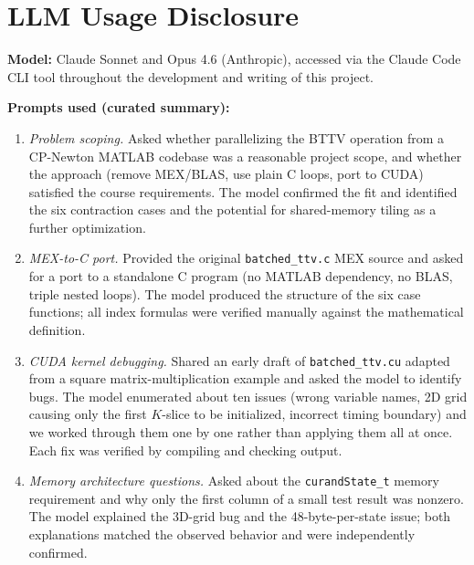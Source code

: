 \documentclass[11pt]{article}
\begin{document}
\appendix
\section{LLM Usage Disclosure}

\textbf{Model:} Claude Sonnet and Opus 4.6 (Anthropic), accessed via the
Claude Code CLI tool throughout the development and writing of this project.

\textbf{Prompts used (curated summary):}

\begin{enumerate}
  \item \textit{Problem scoping.} Asked whether parallelizing the BTTV
        operation from a CP-Newton MATLAB codebase was a reasonable project
        scope, and whether the approach (remove MEX/BLAS, use plain C loops,
        port to CUDA) satisfied the course requirements.  The model confirmed
        the fit and identified the six contraction cases and the potential for
        shared-memory tiling as a further optimization.

  \item \textit{MEX-to-C port.} Provided the original \texttt{batched\_ttv.c}
        MEX source and asked for a port to a standalone C program (no MATLAB
        dependency, no BLAS, triple nested loops).  The model produced the
        structure of the six case functions; all index formulas were
        verified manually against the mathematical definition.

  \item \textit{CUDA kernel debugging.} Shared an early draft of
        \texttt{batched\_ttv.cu} adapted from a square matrix-multiplication
        example and asked the model to identify bugs.  The model enumerated
        about ten issues (wrong variable names, 2D grid causing only the
        first $K$-slice to be initialized, incorrect timing boundary) and we
        worked through them one by one rather than applying them all at once.
        Each fix was verified by compiling and checking output.

  \item \textit{Memory architecture questions.} Asked about the
        \texttt{curandState\_t} memory requirement and why only the first
        column of a small test result was nonzero.  The model explained the
        3D-grid bug and the 48-byte-per-state issue; both explanations matched
        the observed behavior and were independently confirmed.


\end{enumerate}
\end{document}
